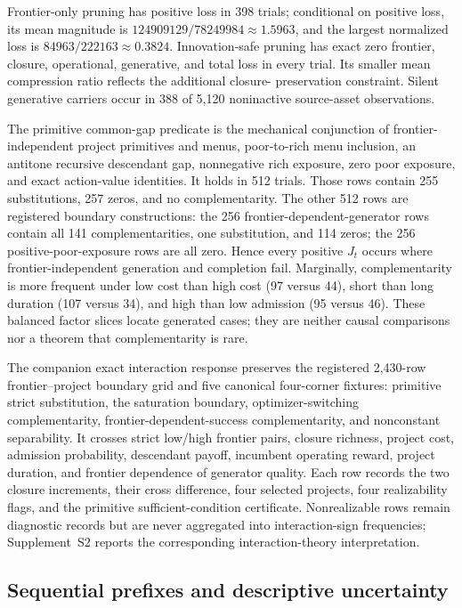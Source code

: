 Frontier-only pruning has positive loss in 398 trials; conditional on positive
loss, its mean magnitude is
\(124909129/78249984\approx1.5963\), and the largest normalized loss is
\(84963/222163\approx0.3824\).  Innovation-safe pruning has exact zero
frontier, closure, operational, generative, and total loss in every trial.
Its smaller mean compression ratio reflects the additional closure-
preservation constraint.  Silent generative carriers occur in 388 of 5,120
noninactive source-asset observations.

The primitive common-gap predicate is the mechanical conjunction of
frontier-independent project primitives and menus, poor-to-rich menu
inclusion, an antitone recursive descendant gap, nonnegative rich exposure,
zero poor exposure, and exact action-value identities.  It holds in 512
trials.  Those rows contain 255 substitutions, 257 zeros, and no
complementarity.  The other 512 rows are registered boundary constructions:
the 256 frontier-dependent-generator rows contain all 141 complementarities,
one substitution, and 114 zeros; the 256 positive-poor-exposure rows are all
zero.  Hence every positive \(J_t\) occurs where frontier-independent
generation and completion fail.  Marginally, complementarity is more frequent
under low cost than high cost (97 versus 44), short than long duration (107
versus 34), and high than low admission (95 versus 46).  These balanced factor
slices locate generated cases; they are neither causal comparisons nor a
theorem that complementarity is rare.

The companion exact interaction response preserves the registered 2,430-row
frontier--project boundary grid and five canonical four-corner fixtures:
primitive strict substitution, the saturation boundary, optimizer-switching
complementarity, frontier-dependent-success complementarity, and nonconstant
separability.  It crosses strict low/high frontier pairs, closure richness,
project cost, admission probability, descendant payoff, incumbent operating
reward, project duration, and frontier dependence of generator quality.  Each
row records the two closure increments, their cross difference, four selected
projects, four realizability flags, and the primitive sufficient-condition
certificate.  Nonrealizable rows remain diagnostic records but are never
aggregated into interaction-sign frequencies; Supplement~S2 reports the
corresponding interaction-theory interpretation.

\subsection{Sequential prefixes and descriptive uncertainty}


